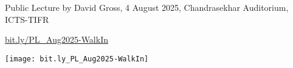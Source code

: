 \documentclass[a4paper]{article}
\begin{document}
Public Lecture by David Gross, 4 August 2025, Chandrasekhar Auditorium, ICTS-TIFR
\vspace{4em}
\begin{center}

{\Huge \url{bit.ly/PL_Aug2025-WalkIn}}

\texttt{[image: bit.ly\_PL\_Aug2025-WalkIn]}
\end{center}
\end{document}
